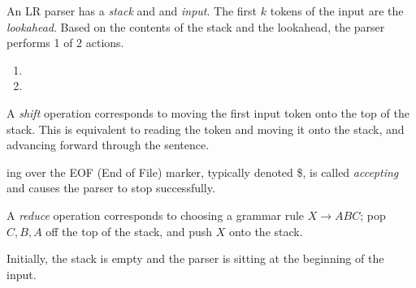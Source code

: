 An LR parser has a \emph{stack} and and \emph{input}.
The first $k$ tokens of the input are the \emph{lookahead}.
Based on the contents of the stack and the lookahead, the parser performs 1 of 2 actions.
\begin{enumerate}[noitemsep]
\item {}
\item {}
\end{enumerate}

\begin{definition}[Shift]\label{def:LR_Shift}
  A \emph{shift} operation corresponds to moving the first input token onto the top of the stack.
  This is equivalent to reading the token and moving it onto the stack, and advancing forward through the sentence.
  \begin{remark}[Accepting]\label{rmk:LR_Accept}
    ing over the EOF (End of File) marker, typically denoted \$, is called \emph{accepting} and causes the parser to stop successfully.
  \end{remark}
\end{definition}

\begin{definition}[Reduce]\label{def:LR_Reduce}
  A \emph{reduce} operation corresponds to choosing a grammar rule $X \rightarrow ABC$; pop $C, B, A$ off the top of the stack, and push $X$ onto the stack.
\end{definition}

Initially, the stack is empty and the parser is sitting at the beginning of the input.


